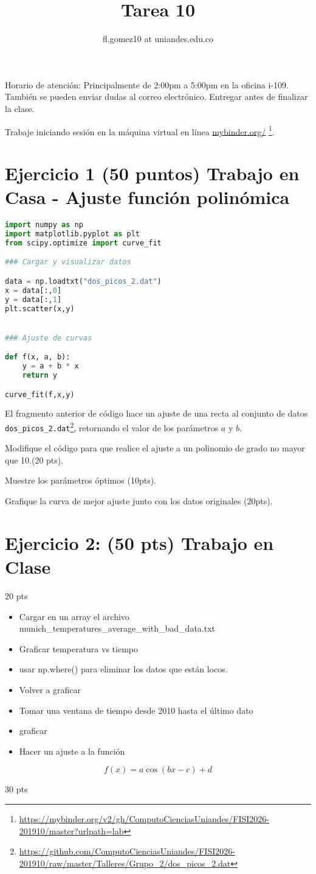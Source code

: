 \documentclass{article}
\title{Tarea 10}
\author{fl.gomez10 at uniandes.edu.co}
\begin{document}
\maketitle

Horario de atención: Principalmente de 2:00pm a 5:00pm en la oficina i-109.
También se pueden enviar dudas al correo electrónico.
Entregar antes de finalizar la clase. 

Trabaje iniciando  sesión en la máquina virtual en línea
\href{https://mybinder.org/v2/gh/ComputoCienciasUniandes/FISI2026-201910/master?urlpath=lab}{mybinder.org/}
\footnote{\url{https://mybinder.org/v2/gh/ComputoCienciasUniandes/FISI2026-201910/master?urlpath=lab}}. 


\section{Ejercicio 1 (50 puntos) Trabajo en Casa - Ajuste función polinómica}

\begin{lstlisting}[language=Python]
import numpy as np
import matplotlib.pyplot as plt
from scipy.optimize import curve_fit

### Cargar y visualizar datos

data = np.loadtxt("dos_picos_2.dat")
x = data[:,0]
y = data[:,1]
plt.scatter(x,y)


### Ajuste de curvas

def f(x, a, b):
    y = a + b * x
    return y

curve_fit(f,x,y)
\end{lstlisting}

El fragmento anterior de código hace un ajuste de una recta al conjunto de datos
\texttt{dos\_picos\_2.dat}\footnote{\url{https://github.com/ComputoCienciasUniandes/FISI2026-201910/raw/master/Talleres/Grupo_2/dos_picos_2.dat}}, retornando el valor de los parámetros $a$ y $b$.

Modifique el código para que realice el ajuste a un polinomio de
grado no mayor que 10.(20 pts).

Muestre los parámetros óptimos (10pts).

Grafique la curva de mejor ajuste junto con los datos originales (20pts).

\section{Ejercicio 2: (50 pts) Trabajo en Clase}

20 pts
\begin{itemize}
\item Cargar en un array el archivo munich\_temperatures\_average\_with\_bad\_data.txt
\item Graficar temperatura vs tiempo
\item usar np.where() para eliminar los datos que están locos.
\item Volver a graficar
\end{itemize}

\begin{itemize}
\item Tomar una ventana de tiempo desde 2010 hasta el último dato
\item graficar
\item Hacer un ajuste a la función
\end{itemize}
\begin{equation}
f(x) = a \cos( b x - c) + d
\end{equation}


30 pts
\end{document}
